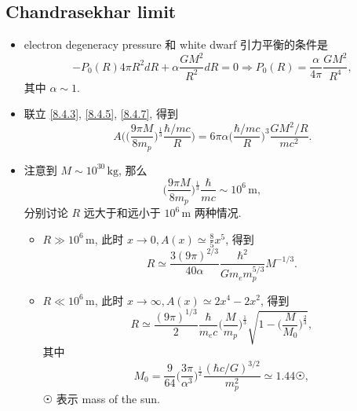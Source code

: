 \subsection{Chandrasekhar limit}
\begin{itemize}
	\item electron degeneracy pressure 和 white dwarf 引力平衡的条件是
	\begin{equation} \label{8.4.7}
		- P_0(R) 4 \pi R^2 dR + \alpha \frac{G M^2}{R^2} dR = 0 \Longrightarrow P_0(R) = \frac{\alpha}{4 \pi} \frac{G M^2}{R^4},
	\end{equation}
	其中 $\alpha \sim 1$.
	
	\item 联立 \eqref{8.4.3}, \eqref{8.4.5}, \eqref{8.4.7}, 得到
	\begin{equation}
		A \Big( \Big( \frac{9 \pi M}{8 m_p} \Big)^{\frac{1}{3}} \frac{\hbar / m c}{R} \Big) = 6 \pi \alpha \Big( \frac{\hbar / m c}{R} \Big)^3 \frac{G M^2 / R}{m c^2}.
	\end{equation}
	
	\item 注意到 $M \sim 10^{30} \, \text{kg}$, 那么
	\begin{equation}
		\Big( \frac{9 \pi M}{8 m_p} \Big)^{\frac{1}{3}} \frac{\hbar}{m c} \sim 10^6 \, \text{m},
	\end{equation}
	分别讨论 $R$ 远大于和远小于 $10^6 \, \text{m}$ 两种情况.
	\begin{itemize}
		\item $R \gg 10^6 \, \text{m}$, 此时 $x \rightarrow 0, A(x) \simeq \frac{8}{5} x^5$, 得到
		\begin{equation}
			R \simeq \frac{3 (9 \pi)^{2 / 3}}{40 \alpha} \frac{\hbar^2}{G m_e m_p^{5 / 3}} M^{- 1 / 3}.
		\end{equation}
		
		\item $R \ll 10^6 \, \text{m}$, 此时 $x \rightarrow \infty, A(x) \simeq 2 x^4 - 2 x^2$, 得到
		\begin{equation}
			R \simeq \frac{(9 \pi)^{1 / 3}}{2} \frac{\hbar}{m_e c} \Big( \frac{M}{m_p} \Big)^{\frac{1}{3}} \sqrt{1 - \Big( \frac{M}{M_0} \Big)^{\frac{2}{3}}},
		\end{equation}
		其中
		\begin{equation}
			M_0 = \frac{9}{64} \Big( \frac{3 \pi}{\alpha^3} \Big)^{\frac{1}{2}} \frac{(\hbar c / G)^{3 / 2}}{m_p^2} \simeq 1.44 \astrosun,
		\end{equation}
		$\astrosun$ 表示 mass of the sun.
	\end{itemize}
\end{itemize}
